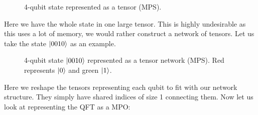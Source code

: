 \begin{figure}[H]
    \centering 
    \caption{4-qubit state represented as a tensor (MPS).}
    \label{fig:psi4t}
\end{figure}
\noindent
Here we have the whole state in one large tensor. This is highly undesirable as this uses a lot of memory, we would rather construct a network of tensors. Let us take the state $\ket{0010}$ as an example.
\begin{figure}[H]
    \centering 
    \caption{4-qubit state $\ket{0010}$ represented as a tensor network (MPS). Red represents $\ket{0}$ and green $\ket{1}$. }
    \label{fig:psi4t_mps}
\end{figure}
\noindent
Here we reshape the tensors representing each qubit to fit with our network structure. They simply have shared indices of size 1 connecting them. 
Now let us look at representing the QFT as a MPO:
